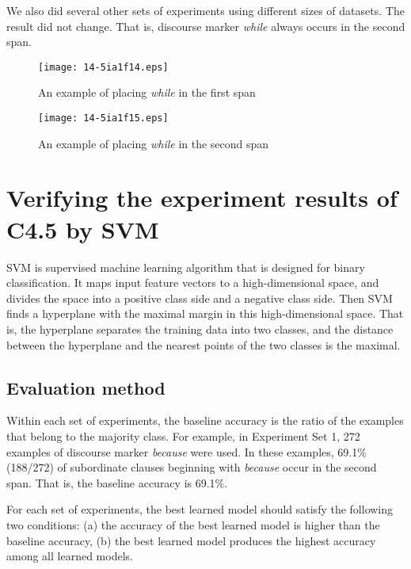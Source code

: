 \documentclass[english]{jnlp_1.3e}
\begin{document}
We also did several other sets of experiments using different
sizes of datasets. The result did not change. That is,
discourse marker \textit{while} always occurs in the second span.

\begin{figure}[t]
\begin{center}
\texttt{[image: 14-5ia1f14.eps]}
\end{center}
 \caption{An example of placing \textit{while} in the first span}
\end{figure}
\begin{figure}[t]
\begin{center}
\texttt{[image: 14-5ia1f15.eps]}
\end{center}
 \caption{An example of placing \textit{while} in the second span}
\end{figure}




\section{Verifying the experiment results of C4.5 by SVM}

SVM is supervised machine learning algorithm that is designed for binary classification. It
maps input feature vectors to a high-dimensional space, and divides the space into a positive
class side and a negative class side. Then SVM finds a hyperplane with the maximal margin
in this high-dimensional space. That is, the hyperplane separates the training data into two
classes, and the distance between the hyperplane and the nearest points of the two classes
is the maximal.

\subsection{Evaluation method}

Within each set of experiments, the baseline accuracy is the ratio of the examples that belong
to the majority class. For example, in Experiment Set 1, 272 examples of discourse marker
\textit{because} were used. In these examples, 69.1\% (188/272) of subordinate clauses beginning with
\textit{because} occur in the second span. That is, the baseline accuracy is 69.1\%.

For each set of experiments, the best learned model should satisfy the following two
conditions: (a) the accuracy of the best learned model is higher than the baseline accuracy,
(b) the best learned model produces the highest accuracy among all learned models.
\end{document}
